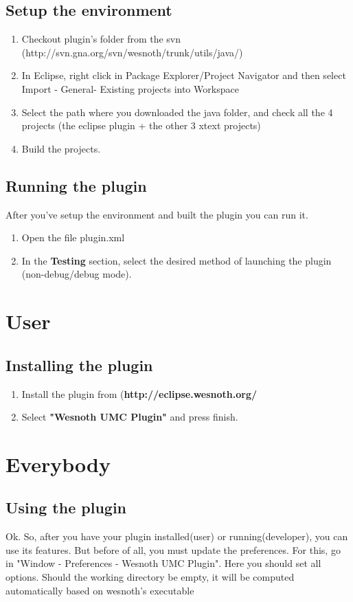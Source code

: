 \documentclass[10pt]{article}
\begin{document}
\subsection{Setup the environment}
\begin{enumerate}
\item Checkout plugin's folder from the svn (http://svn.gna.org/svn/wesnoth/trunk/utils/java/)
\item In Eclipse, right click in Package Explorer/Project Navigator and then select
  Import - General- Existing projects into Workspace
\item Select the path where you downloaded the java folder, and check all the 4 projects
  (the eclipse plugin + the other 3 xtext projects)
\item Build the projects.
\end{enumerate}

\subsection{Running the plugin}
After you've setup the environment and built the plugin you can run it.
\begin{enumerate}
\item Open the file plugin.xml
\item In the \textbf{Testing} section, select the desired method of launching the plugin
  (non-debug/debug mode).
\end{enumerate}

\section{User}
\subsection{Installing the plugin}
\begin{enumerate}
\item Install the plugin from (\textbf{http://eclipse.wesnoth.org/}
\item Select \textbf{"Wesnoth UMC Plugin"} and press finish.
\end{enumerate}


\section{Everybody}
\subsection{Using the plugin}
Ok. So, after you have your plugin installed(user) or running(developer), you can use its features.
But before of all, you must update the preferences. For this, go in "Window - Preferences - Wesnoth UMC Plugin".
Here you should set all options. Should the working directory be empty, it will be computed automatically
based on wesnoth's executable
\end{document}
